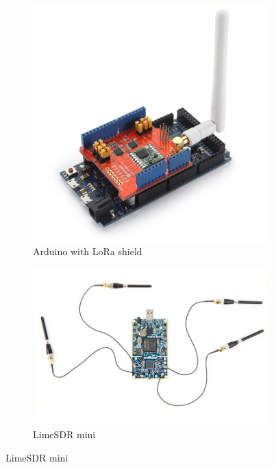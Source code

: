 \begin{figure}
    \centering
    \begin{subfigure}[b]{0.25\textwidth}
     \includegraphics[width=1\textwidth]{figures/arduino.png}
     \caption{Arduino with LoRa shield}
    \end{subfigure}%
    \hspace{2em}
    \begin{subfigure}[b]{0.25\textwidth}
     \includegraphics[width=1\textwidth]{figures/limesdr.png}
     \caption{LimeSDR mini}
    \end{subfigure}

\end{figure}
